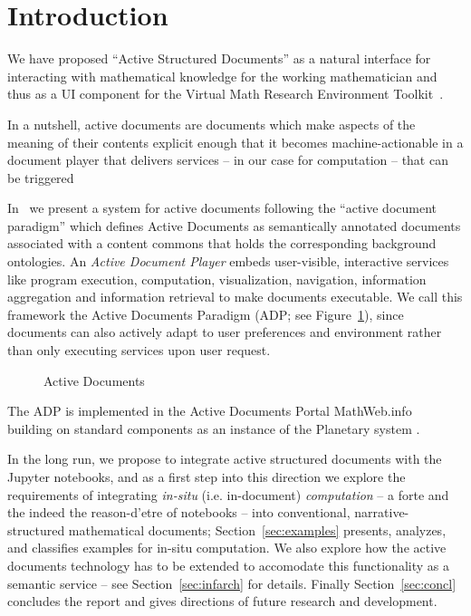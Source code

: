 \section{Introduction}\label{sec:intro}


We have proposed ``Active Structured Documents'' as a natural interface for interacting
with mathematical knowledge for the working mathematician and thus as a UI component for
the \pn Virtual Math Research Environment Toolkit~\cite{ODK-D4.2}.

In a nutshell, active documents are documents which make aspects of the meaning of their
contents explicit enough that it becomes machine-actionable in a document player that
delivers services -- in our case for computation -- that can be triggered 

In~\cite{KohDavGin:psewads11} we present a system for active documents following the
``active document paradigm'' which defines Active Documents as semantically annotated
documents associated with a content commons that holds the corresponding background
ontologies. An \textit{Active Document Player} embeds user-visible, interactive services
like program execution, computation, visualization, navigation, information aggregation
and information retrieval to make documents executable. We call this framework the Active
Documents Paradigm (ADP; see Figure~\ref{fig:activedocs}), since documents can also
actively adapt to user preferences and environment rather than only executing services
upon user request.
\begin{figure}[ht]\centering
  
  \caption{Active Documents}\label{fig:activedocs} 
\end{figure} 

The ADP is implemented in the Active Documents Portal MathWeb.info~\cite{MathHub:on}
building on standard components as an instance of the Planetary system
\cite{Kohlhase:ppte12}.

In the long run, we propose to integrate active structured documents with the Jupyter
notebooks, and as a first step into this direction we explore the requirements of
integrating \emph{in-situ} (i.e. in-document) \emph{computation} -- a forte and the indeed
the reason-d'etre of notebooks -- into conventional, narrative-structured mathematical
documents; Section~\ref{sec:examples} presents, analyzes, and classifies examples for
in-situ computation.  We also explore how the active documents technology has to be
extended to accomodate this functionality as a semantic service -- see
Section~\ref{sec:infarch} for details. Finally Section~\ref{sec:concl} concludes the report
and gives directions of future research and development.


